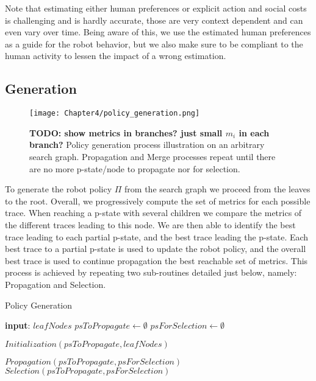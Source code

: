 Note that estimating either human preferences or explicit action and social costs is challenging and is hardly accurate, those are very context dependent and can even vary over time.
Being aware of this, we use the estimated human preferences as a guide for the robot behavior, but we also make sure to be compliant to the human activity to lessen the impact of a wrong estimation. 

    \subsection{Generation}

\begin{figure}
    \texttt{[image: Chapter4/policy\_generation.png]}
    \caption{\textbf{TODO: show metrics in branches? just small $m_i$ in each branch?} Policy generation process illustration on an arbitrary search graph. Propagation and Merge processes repeat until there are no more p-state/node to propagate nor for selection.}
    \label{fig:policy_generation}
\end{figure}

To generate the robot policy $\Pi$ from the search graph we proceed from the leaves to the root. 
Overall, we progressively compute the set of metrics for each possible trace. When reaching a p-state with several children we compare the metrics of the different traces leading to this node. We are then able to identify the best trace leading to each partial p-state, and the best trace leading the p-state. Each best trace to a partial p-state is used to update the robot policy, and the overall best trace is used to continue propagation the best reachable set of metrics.
This process is achieved by repeating two sub-routines detailed just below, namely: Propagation and Selection. 

\begin{algorithm}
\caption{Policy Generation}\label{alg:policy_generation}
\begin{algorithmic}[1]

\State \textbf{input}: $leafNodes$ 
\State $psToPropagate \gets \emptyset$
\State $psForSelection \gets \emptyset$

\State $Initialization(psToPropagate, leafNodes)$

    \State $Propagation(psToPropagate, psForSelection)$
    \State $Selection(psToPropagate, psForSelection)$
\EndWhile

\end{algorithmic}
\end{algorithm}

